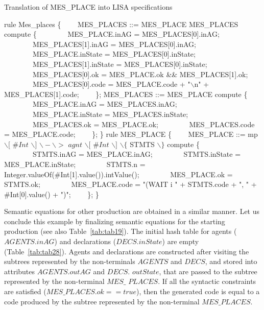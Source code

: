 \documentclass[preprint, prX]{revtex4}
\begin{document}
\begin{algorithm}[tbh]
\caption{Translation of MES\_PLACE into LISA specifications}
\label{alg:mp_lisa}
\scriptsize
\begin{algorithmic}[1]
\STATE rule Mes\_places \{
\STATE \ \ \ \ MES\_PLACES ::= MES\_PLACE MES\_PLACES compute \{
\STATE \ \ \ \ \ \ \ \ MES\_PLACE.inAG = MES\_PLACES[0].inAG;
\STATE \ \ \ \ \ \ \ \ MES\_PLACES[1].inAG = MES\_PLACES[0].inAG;
\STATE \ \ \ \ \ \ \ \ MES\_PLACE.inState = MES\_PLACES[0].inState;
\STATE \ \ \ \ \ \ \ \ MES\_PLACES[1].inState = MES\_PLACES[0].inState;
\STATE \ \ \ \ \ \ \ \ MES\_PLACES[0].ok = MES\_PLACE.ok \&\& MES\_PLACES[1].ok;
\STATE \ \ \ \ \ \ \ \ MES\_PLACES[0].code = MES\_PLACE.code + "$\backslash$n" + MES\_PLACES[1].code;
\STATE \ \ \ \ \};
\STATE MES\_PLACES ::=  MES\_PLACE compute \{
\STATE \ \ \ \ \ \ \ \ MES\_PLACE.inAG = MES\_PLACES.inAG;
\STATE \ \ \ \ \ \ \ \ MES\_PLACE.inState = MES\_PLACES.inState;
\STATE \ \ \ \ \ \ \ \ MES\_PLACES.ok = MES\_PLACE.ok;
\STATE \ \ \ \ \ \ \ \ MES\_PLACES.code = MES\_PLACE.code;
\STATE \ \ \ \ \};
\STATE \}
\STATE rule MES\_PLACE \{
\STATE \ \ \ \ MES\_PLACE ::= mp $\backslash[$ \#$\mathit{Int}$ $\backslash]$ $\backslash-\backslash>$ $\mathit{agnt}$
$\backslash[$ \#$\mathit{Int}$ $\backslash]$ $\backslash\{$ STMTS $\backslash\}$ compute \{
\STATE \ \ \ \ \ \ \ \ STMTS.inAG = MES\_PLACE.inAG;
\STATE \ \ \ \ \ \ \ \ STMTS.inState = MES\_PLACE.inState;
\STATE \ \ \ \ \ \ \ \ STMTS.n = Integer.valueOf(\#Int[1].value()).intValue();
\STATE \ \ \ \ \ \ \ \ MES\_PLACE.ok = STMTS.ok;
\STATE \ \ \ \ \ \ \ \ MES\_PLACE.code = "(WAIT i " + STMTS.code + ", " + \#Int[0].value() + ")";
\STATE \ \ \ \ \};
\STATE \}
\end{algorithmic}
\normalsize
\end{algorithm}

Semantic equations for other production are obtained in a similar manner. Let us conclude this example by finalizing semantic equations for the starting production (see also Table~\ref{tab:tab19}). The initial hash table for agents ($AGENTS.inAG$) and declarations ($DECS.inState$) are empty (Table~\ref{tab:tab28}). Agents and declarations are constructed after visiting the subtrees represented by the non-terminals $AGENTS$ and $DECS$, and stored into attributes $AGENTS.outAG$ and $DECS.$ $outState$, that are passed to the subtree represented by the non-terminal $MES\_$ $PLACES$. If all the syntactic constraints are satisfied ($MES\_PLACES.ok==true$), then the generated code is equal to a code produced by the subtree represented by the non-terminal $MES\_PLACES$.
\end{document}
